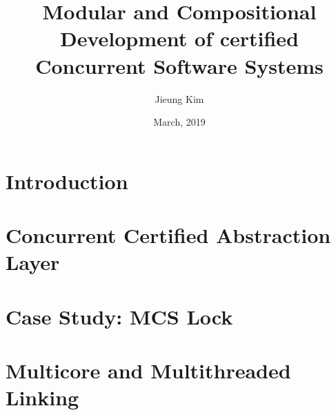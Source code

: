 \documentclass[letterpaper,11pt]{yalephd}
\begin{document}
\title{Modular and Compositional Development of certified Concurrent Software Systems}
\author{Jieung Kim}
\date{March, 2019} 

\frontmatter

\begin{abstract}

\end{abstract}


\maketitle
{} %



\tableofcontents
\listoffigures %
\listoftables %


\mainmatter

\chapter{Introduction}
\label{chapter:introduction}


\chapter{Concurrent Certified Abstraction Layer}
\label{chapter:ccal}



\chapter{Case Study: MCS Lock}
\label{chapter:mcs lock}
%
%



%



\chapter{Multicore and Multithreaded Linking}
\label{chapter:linking}
\end{document}
